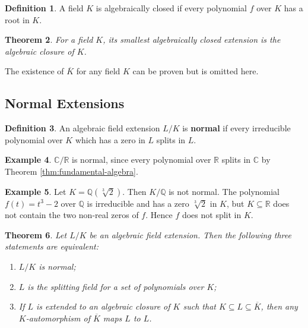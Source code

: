 \documentclass[12pt]{article}
\newtheorem{theorem}{Theorem}
\theoremstyle{definition}
\newtheorem{definition}[theorem]{Definition}
\newtheorem{example}[theorem]{Example}
\newcommand{\Q}{\mathbb Q}
\newcommand{\C}{\mathbb C}
\newcommand{\R}{\mathbb R}
\begin{document}
\begin{definition}
    A field $K$ is algebraically closed if every polynomial $f$ over $K$ has a root in $K$. 
\end{definition}

\begin{theorem}
    For a field $K$, its smallest algebraically closed extension is the algebraic closure of $K$.
\end{theorem}

The existence of $\overline K$ for any field $K$ can be proven but is omitted here. 

\subsection{Normal Extensions}


\begin{definition}
    An algebraic field extension $L/ K$ is \textbf{normal} if every irreducible polynomial over $K$ which has a zero in $L$ splits in $L$. 
\end{definition}
\begin{example}
    $\C / \R$ is normal, since every polynomial over $\R$ splits in $\C$ by Theorem \ref{thm:fundamental-algebra}.
\end{example}
\begin{example}
    Let $K = \Q(\sqrt[3]{2})$. Then $K / \Q$ is not normal. The polynomial $f(t) = t^3 - 2$ over $\Q$ is irreducible and has a zero $\sqrt[3]{2}$ in $K$, but $K \subseteq \R$ does not contain the two non-real zeros of $f$. Hence $f$ does not split in $K$.
\end{example}
\begin{theorem}
    Let $L/K$ be an algebraic field extension. Then the following three statements are equivalent:
    \begin{enumerate}[label=(\roman*)]
        \item $L/K$ is normal;
        \item $L$ is the splitting field for a set of polynomials over $K$;
        \item If $L$ is extended to an algebraic closure of $K$ such that $K \subseteq L \subseteq \overline K$, then any $K$-automorphism of $\overline K$ maps $L$ to $L$. 
    \end{enumerate}
\end{theorem}
\end{document}
